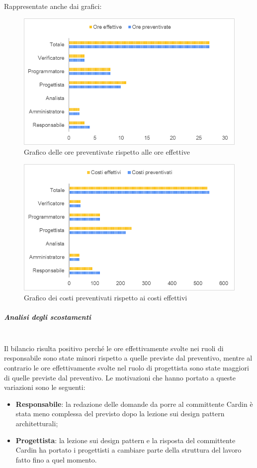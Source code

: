 Rappresentate anche dai grafici:
\begin{figure} [H]
	\includegraphics[width=\linewidth]{./img/Grafici/37.png}
	\caption{Grafico delle ore preventivate rispetto alle ore effettive}
\end{figure}

\begin{figure} [H]
	\includegraphics[width=\linewidth]{./img/Grafici/38.png}
	\caption{Grafico dei costi preventivati rispetto ai costi effettivi}
\end{figure}

\subparagraph*{Analisi degli scostamenti} \mbox{} \\
Il bilancio risulta positivo perché le ore effettivamente svolte nei ruoli di responsabile sono state minori rispetto a quelle previste dal preventivo, mentre al contrario le ore effettivamente svolte nel ruolo di progettista sono state maggiori di quelle previste dal preventivo.
Le motivazioni che hanno portato a queste variazioni sono le seguenti:
\begin{itemize}
	\item \textbf{Responsabile}: la redazione delle domande da porre al committente Cardin è stata meno complessa del previsto dopo la lezione sui design pattern architetturali;
	\item \textbf{Progettista}: la lezione sui design pattern e la risposta del committente Cardin ha portato i progettisti a cambiare parte della struttura del lavoro fatto fino a quel momento.
\end{itemize}


